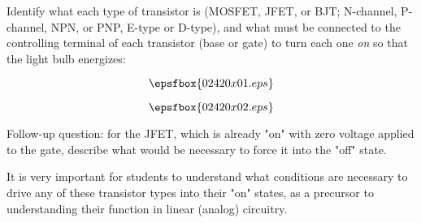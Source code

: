 

Identify what each type of transistor is (MOSFET, JFET, or BJT; N-channel, P-channel, NPN, or PNP, E-type or D-type), and what must be connected to the controlling terminal of each transistor (base or gate) to turn each one {\it on} so that the light bulb energizes:

$$\epsfbox{02420x01.eps}$$







$$\epsfbox{02420x02.eps}$$

\vskip 10pt

Follow-up question: for the JFET, which is already "on" with zero voltage applied to the gate, describe what would be necessary to force it into the "off" state.







It is very important for students to understand what conditions are necessary to drive any of these transistor types into their "on" states, as a precursor to understanding their function in linear (analog) circuitry.




